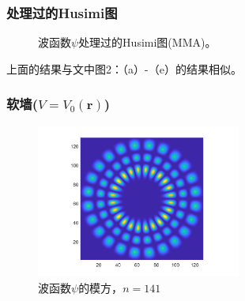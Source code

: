 \documentclass[UTF8]{beamer}
\begin{document}
\begin{frame}
    \frametitle{处理过的Husimi图}
    \begin{figure}
        \centering
        \caption{波函数$\psi$处理过的Husimi图(MMA)。}
    \end{figure}
    上面的结果与文中\cite{mason2015revealing}图2：（a）-（e）的结果相似。
\end{frame}

\begin{frame}
    \frametitle{软墙($V=V_0(\mathbf{r})$)}
    \begin{figure}
        \centering
        \includegraphics[width = 0.6\textwidth]{../images/figure/141_Psi.png}
        \caption{波函数$\psi$的模方，$n=141$}
    \end{figure} 
\end{frame}
\end{document}
